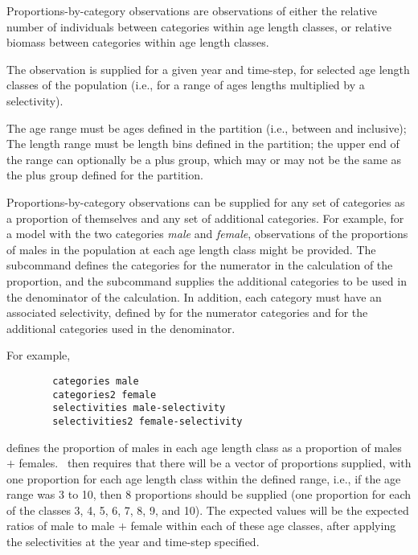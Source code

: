 
Proportions-by-category observations are observations of either the relative number of individuals between categories within \ifAgeBased age \else length \fi classes, or relative biomass between categories within \ifAgeBased age \else length \fi classes.

The observation is supplied for a given year and time-step, for selected \ifAgeBased age \else length \fi classes of the population (i.e., for a range of \ifAgeBased ages \else lengths \fi multiplied by a selectivity).

\ifAgeBased 
The age range must be ages defined in the partition (i.e., between  and  inclusive); 
\else 
The length range must be length bins defined in the partition;
\fi
the upper end of the range can optionally be a plus group, which may or may not be the same as the plus group defined for the partition.

Proportions-by-category observations can be supplied for any set of categories as a proportion of themselves and any set of additional categories. For example, for a model with the two categories \emph{male} and \emph{female}, observations of the proportions of males in the population at each \ifAgeBased age \else length \fi class might be provided. The subcommand  defines the categories for the numerator in the calculation of the proportion, and the subcommand  supplies the additional categories to be used in the denominator of the calculation. In addition, each category must have an associated selectivity, defined by  for the numerator categories and  for the additional categories used in the denominator.

For example,

{\small{\begin{verbatim}
		categories male
		categories2 female
		selectivities male-selectivity
		selectivities2 female-selectivity
		\end{verbatim}}}

defines the proportion of males in each \ifAgeBased age \else length \fi class as a proportion of males $+$ females. \CNAME\ then requires that there will be a vector of proportions supplied, with one proportion for each \ifAgeBased age \else length \fi class within the defined range, i.e., if the age range was 3 to 10, then 8 proportions should be supplied (one proportion for each of the classes 3, 4, 5, 6, 7, 8, 9, and 10). The expected values will be the expected ratios of male to male $+$ female within each of these age classes, after applying the selectivities at the year and time-step specified.

